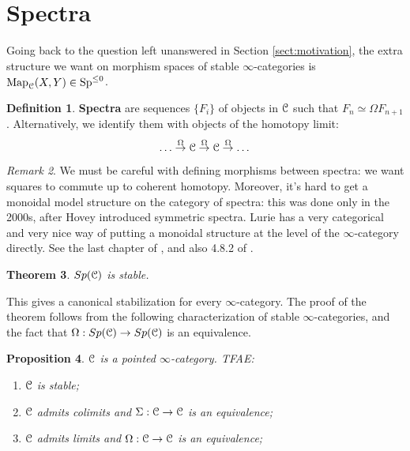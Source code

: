 \documentclass[10pt,a4paper,reqno,oneside]{book} %
\theoremstyle{plain}
\newtheorem{thm}{Theorem}[section]
\newtheorem{prop}[thm]{Proposition}
\theoremstyle{definition}
\newtheorem{defin}[thm]{Definition}
\theoremstyle{remark}
\newtheorem{rem}[thm]{Remark}
\numberwithin{equation}{section}
\begin{document}
\section{Spectra}
\label{sect:spectra}

Going back to the question left unanswered in Section \ref{sect:motivation}, the extra structure we want on
morphism spaces of stable $\infty$-categories is $\operatorname{Map}_{\mathcal C}(X,Y) \in \operatorname{Sp}^{\leq 0}$.

\begin{defin}
\textbf{Spectra} are sequences $\{F_i\}$ of objects in $\mathcal C$ such that $F_n \simeq \Omega F_{n+1}$. Alternatively,
we identify them with objects of the homotopy limit:
\[	\dots \overset{\Omega}{\to} \mathcal C \overset{\Omega}{\to} \mathcal C \overset{\Omega}{\to} \dots	\]
\end{defin}

\begin{rem}
We must be careful with defining morphisms between spectra: we want squares to commute up to coherent homotopy.
Moreover, it's hard to get a monoidal model structure on the category of spectra: this was done only in the 2000s, after Hovey 
introduced symmetric spectra. Lurie has a very categorical and very nice way of putting a monoidal structure 
at the level of the $\infty$-category
directly. See the last chapter of \cite{Groth}, and also 4.8.2 of \cite{Lurie_Higher_algebra}.
\end{rem}

\begin{thm}
$Sp(\mathcal C)$ is stable.
\end{thm}

This gives a canonical stabilization for every $\infty$-category. The proof of the theorem follows from the following characterization
of stable $\infty$-categories,
and the fact that $\Omega:Sp(\mathcal C) \to Sp(\mathcal C)$ is an equivalence.

\begin{prop}
\label{prop:stable_shift}
$\mathcal C$ is a pointed $\infty$-category. TFAE:
\begin{enumerate}
\item $\mathcal C$ is stable;
\item $\mathcal C$ admits colimits and $\Sigma : \mathcal C \to \mathcal C$ is an equivalence;
\item $\mathcal C$ admits limits and $\Omega : \mathcal C \to \mathcal C$ is an equivalence;
\end{enumerate}
\end{prop}
\end{document}
